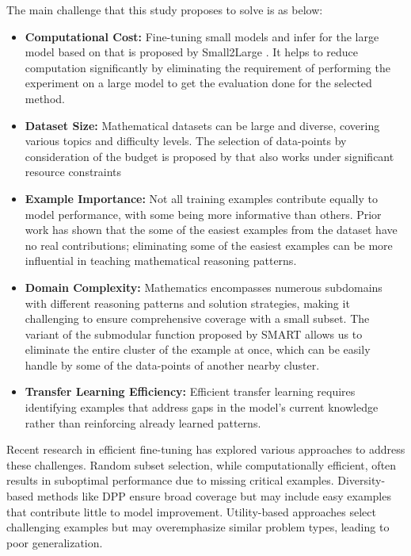 \documentclass{article}
\begin{document}
The main challenge that this study proposes to solve is as below:
\begin{itemize}
    \item \textbf{Computational Cost:} Fine-tuning small models and infer for the large model based on that is proposed by Small2Large \cite{yang2024smalltolarge}. It helps to reduce computation significantly by eliminating the requirement of performing the experiment on a large model to get the evaluation done for the selected method.
    \item \textbf{Dataset Size:} Mathematical datasets can be large and diverse, covering various topics and difficulty levels. The selection of data-points by consideration of the budget is proposed by \cite{banerjee2020budgeted} that also works under significant resource constraints
    \item \textbf{Example Importance:} Not all training examples contribute equally to model performance, with some being more informative than others. Prior work has shown that the some of the easiest examples from the dataset have no real contributions; eliminating some of the easiest examples can be more influential in teaching mathematical reasoning patterns.
    \item \textbf{Domain Complexity:} Mathematics encompasses numerous subdomains with different reasoning patterns and solution strategies, making it challenging to ensure comprehensive coverage with a small subset. The variant of the submodular function proposed by SMART \cite{renduchintala2024smart} allows us to eliminate the entire cluster of the example at once, which can be easily handle by some of the data-points of another nearby cluster.
    \item \textbf{Transfer Learning Efficiency:} Efficient transfer learning requires identifying examples that address gaps in the model's current knowledge rather than reinforcing already learned patterns.
\end{itemize}

Recent research in efficient fine-tuning has explored various approaches to address these challenges. Random subset selection, while computationally efficient, often results in suboptimal performance due to missing critical examples. Diversity-based methods like DPP ensure broad coverage but may include easy examples that contribute little to model improvement. Utility-based approaches select challenging examples but may overemphasize similar problem types, leading to poor generalization.
\end{document}
